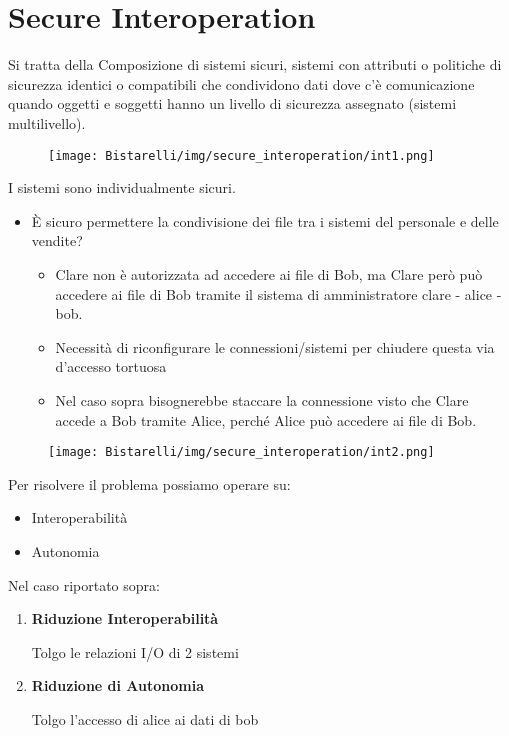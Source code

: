 \chapter{Secure Interoperation}
Si tratta della Composizione di sistemi sicuri, sistemi con attributi o politiche di sicurezza identici o compatibili che condividono dati dove c'è comunicazione quando oggetti e soggetti hanno un livello di sicurezza assegnato (sistemi multilivello). 

\begin{figure}[H]
	\centering
    \texttt{[image: Bistarelli/img/secure\_interoperation/int1.png]}
\end{figure}

I sistemi sono individualmente sicuri.
\begin{itemize}
    \item È sicuro permettere la condivisione dei file tra i sistemi del personale e delle vendite?
    
    \begin{itemize}
        \item Clare non è autorizzata ad accedere ai file di Bob, ma Clare però può accedere ai file di Bob tramite il sistema di amministratore clare - alice - bob.
        
        \item Necessità di riconfigurare le connessioni/sistemi per chiudere questa via d'accesso tortuosa
        
        \item Nel caso sopra bisognerebbe staccare la connessione visto che Clare accede a Bob tramite Alice, perché Alice può accedere ai file di Bob.
    \end{itemize}
\end{itemize}

\begin{figure}[H]
	\centering
    \texttt{[image: Bistarelli/img/secure\_interoperation/int2.png]}
\end{figure}

Per risolvere il problema possiamo operare su:
\begin{itemize}
    \item Interoperabilità
    
    \item Autonomia
\end{itemize}
Nel caso riportato sopra:
\begin{enumerate}
    \item \textbf{Riduzione Interoperabilità}
    
    Tolgo le relazioni I/O di 2 sistemi 
    
    \item \textbf{Riduzione di Autonomia}
    
    Tolgo l'accesso di alice ai dati di bob
\end{enumerate}

